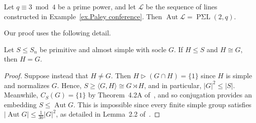 \begin{theorem}
\label{thm: PSL automorphism group}
Let $q\equiv 3 \bmod 4$ be a prime power, and let $\mathscr{L}$ be the sequence of lines constructed in Example~\ref{ex.Paley conference}.
Then $\operatorname{Aut} \mathscr{L} = \operatorname{P\text{$\Sigma$}L}(2,q)$.
\end{theorem}

Our proof uses the following detail.

\begin{proposition}
\label{prop: one copy of socle}
Let $S \leq S_n$ be primitive and almost simple with socle $G$.
If $H \leq S$ and $H \cong G$, then $H = G$.
\end{proposition}

\begin{proof}
Suppose instead that $H \neq G$.
Then $H \triangleright (G \cap H) = \{1\}$ since $H$ is simple and normalizes $G$.
Hence, $S \geq \langle G, H \rangle \cong G \rtimes H$, and in particular, $|G|^2 \leq |S|$.
Meanwhile, $C_S(G) = \{1\}$ by Theorem~4.2A of~\cite{DixonMortimer:96}, and so conjugation provides an embedding $S \leq \operatorname{Aut} G$.
This is impossible since every finite simple group satisfies $|\operatorname{Aut} G| \leq \frac{1}{30} |G|^2$, as detailed in Lemma~2.2 of~\cite{Quick:04}.
\end{proof}

